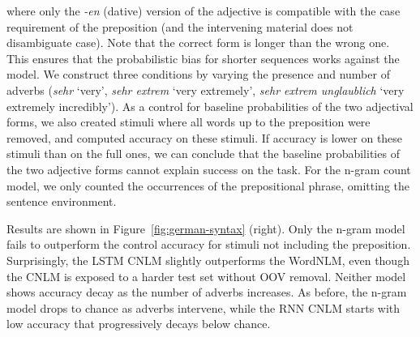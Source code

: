 where only the \emph{-en} (dative) version of the adjective is
compatible with the case requirement of the preposition (and the
intervening material does not disambiguate case). Note that the
correct form is longer than the wrong one. This ensures that the
probabilistic bias for shorter sequences works against the model.  We
construct three conditions by varying the presence and number of
adverbs (\emph{sehr} `very', \emph{sehr extrem} `very extremely',
\emph{sehr extrem unglaublich} `very extremely incredibly').  As a
control for baseline probabilities of the two adjectival forms, we
also created stimuli where all words up to the preposition were
removed, and computed accuracy on these stimuli.  If accuracy is lower
on these stimuli than on the full ones, we can conclude that the
baseline probabilities of the two adjective forms cannot explain
success on the task. For the n-gram count model, we only counted the
occurrences of the prepositional phrase, omitting the sentence
environment.

%
%
Results are shown in Figure~\ref{fig:german-syntax} (right). Only
the n-gram model fails to outperform the control accuracy for
stimuli not including the preposition. Surprisingly, the LSTM CNLM slightly
outperforms the WordNLM, even though the CNLM is exposed
to a harder test set without OOV removal.  Neither model shows
accuracy decay as the number of adverbs increases.  As before, the
n-gram model drops to chance as adverbs intervene, while the RNN CNLM
starts with low accuracy that progressively decays below chance.



